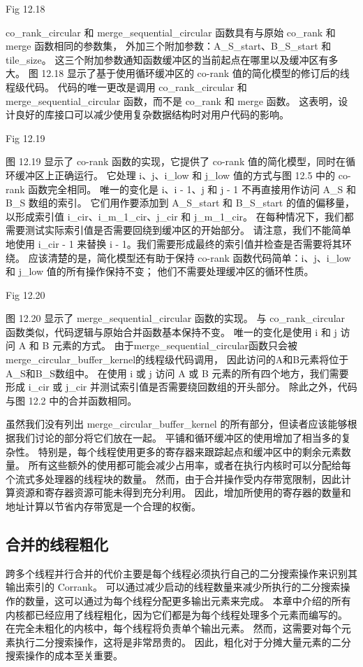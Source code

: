 {\color{red} Fig 12.18}

co\_rank\_circular 和 merge\_sequential\_circular 函数具有与原始 co\_rank 和 merge 函数相同的参数集，
外加三个附加参数：A\_S\_start、B\_S\_start 和tile\_size。 
这三个附加参数通知函数缓冲区的当前起点在哪里以及缓冲区有多大。 
图 12.18 显示了基于使用循环缓冲区的 co-rank 值的简化模型的修订后的线程级代码。 
代码的唯一更改是调用 co\_rank\_circular 和 merge\_sequential\_circular 函数，而不是 co\_rank 和 merge 函数。 
这表明，设计良好的库接口可以减少使用复杂数据结构时对用户代码的影响。

{\color{red} Fig 12.19}

图 12.19 显示了 co-rank 函数的实现，它提供了 co-rank 值的简化模型，同时在循环缓冲区上正确运行。 
它处理 i、j、i\_low 和 j\_low 值的方式与图 12.5 中的 co-rank 函数完全相同。 
唯一的变化是 i、i - 1、j 和 j - 1 不再直接用作访问 A\_S 和 B\_S 数组的索引。 
它们用作要添加到 A\_S\_start 和 B\_S\_start 的值的偏移量，
以形成索引值 i\_cir、i\_m\_1\_cir、j\_cir 和 j\_m\_1\_cir。 
在每种情况下，我们都需要测试实际索引值是否需要回绕到缓冲区的开始部分。 
请注意，我们不能简单地使用 i\_cir - 1 来替换 i - 1。我们需要形成最终的索引值并检查是否需要将其环绕。 
应该清楚的是，简化模型还有助于保持 co-rank 函数代码简单：i、j、i\_low 和 j\_low 值的所有操作保持不变； 
他们不需要处理缓冲区的循环性质。

{\color{red} Fig 12.20}

图 12.20 显示了 merge\_sequential\_circular 函数的实现。 
与 co\_rank\_circular 函数类似，代码逻辑与原始合并函数基本保持不变。 
唯一的变化是使用 i 和 j 访问 A 和 B 元素的方式。 
由于merge\_sequential\_circular函数只会被merge\_circular\_buffer\_kernel的线程级代码调用，
因此访问的A和B元素将位于A\_S和B\_S数组中。 
在使用 i 或 j 访问 A 或 B 元素的所有四个地方，我们需要形成 i\_cir 或 j\_cir 并测试索引值是否需要绕回数组的开头部分。 
除此之外，代码与图 12.2 中的合并函数相同。

虽然我们没有列出 merge\_circular\_buffer\_kernel 的所有部分，但读者应该能够根据我们讨论的部分将它们放在一起。 
平铺和循环缓冲区的使用增加了相当多的复杂性。 特别是，每个线程使用更多的寄存器来跟踪起点和缓冲区中的剩余元素数量。 
所有这些额外的使用都可能会减少占用率，或者在执行内核时可以分配给每个流式多处理器的线程块的数量。 
然而，由于合并操作受内存带宽限制，因此计算资源和寄存器资源可能未得到充分利用。 
因此，增加所使用的寄存器的数量和地址计算以节省内存带宽是一个合理的权衡。

\subsection{合并的线程粗化}
跨多个线程并行合并的代价主要是每个线程必须执行自己的二分搜索操作来识别其输出索引的 Corrank。 
可以通过减少启动的线程数量来减少所执行的二分搜索操作的数量，这可以通过为每个线程分配更多输出元素来完成。 
本章中介绍的所有内核都已经应用了线程粗化，因为它们都是为每个线程处理多个元素而编写的。 
在完全未粗化的内核中，每个线程将负责单个输出元素。 然而，这需要对每个元素执行二分搜索操作，这将是非常昂贵的。 
因此，粗化对于分摊大量元素的二分搜索操作的成本至关重要。

